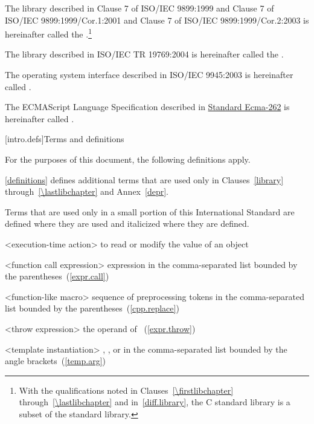 \pnum
The library described in Clause 7 of ISO/IEC 9899:1999 and Clause 7 of
ISO/IEC 9899:1999/Cor.1:2001 and Clause 7 of ISO/IEC
9899:1999/Cor.2:2003 is hereinafter called the
.\footnote{With the qualifications noted in Clauses~\ref{\firstlibchapter}
through~\ref{\lastlibchapter} and in~\ref{diff.library}, the C standard
library is a subset of the \Cpp standard library.}

\pnum
The library described in ISO/IEC TR 19769:2004 is hereinafter called the
.

\pnum
The operating system interface described in ISO/IEC 9945:2003 is
hereinafter called .

\pnum
The ECMAScript Language Specification described in \href{http://www.ecma-international.org/publications/standards/Ecma-262.htm}{Standard Ecma-262} is
hereinafter called .

[intro.defs]{Terms and definitions}

\pnum
{}%
For the purposes of this document, the following definitions apply.

\pnum
\ref{definitions}
defines additional terms that are used only in Clauses~\ref{library}
through~\ref{\lastlibchapter} and Annex~\ref{depr}.

\pnum
Terms that are used only in a small portion of this International
Standard are defined where they are used and italicized where they are
defined.

%
<execution-time action> to read or modify the value of an object

%
<function call expression> expression in the
comma-separated list bounded by the parentheses~(\ref{expr.call})

%
%
<function-like macro> sequence of preprocessing tokens in the
comma-separated list bounded by the parentheses~(\ref{cpp.replace})

%
%
<throw expression> the operand of ~(\ref{expr.throw})

%
%
<template instantiation>
,
, or
 in the comma-separated
list bounded by the angle brackets~(\ref{temp.arg})

